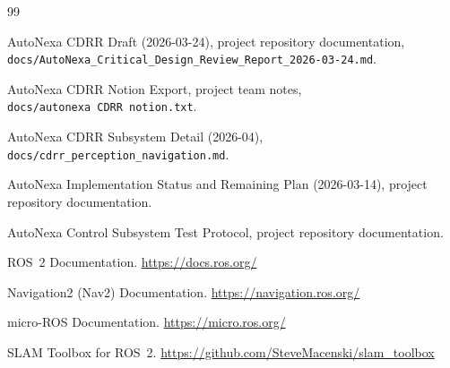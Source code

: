 \documentclass[12pt,a4paper]{report}
\begin{document}
\begin{thebibliography}{99}

AutoNexa CDRR Draft (2026-03-24), project repository documentation, \texttt{docs/AutoNexa\_Critical\_Design\_Review\_Report\_2026-03-24.md}.

AutoNexa CDRR Notion Export, project team notes, \texttt{docs/autonexa~CDRR~notion.txt}.

AutoNexa CDRR Subsystem Detail (2026-04), \texttt{docs/cdrr\_perception\_navigation.md}.

AutoNexa Implementation Status and Remaining Plan (2026-03-14), project repository documentation.

AutoNexa Control Subsystem Test Protocol, project repository documentation.

ROS~2 Documentation. \url{https://docs.ros.org/}

Navigation2 (Nav2) Documentation. \url{https://navigation.ros.org/}

micro-ROS Documentation. \url{https://micro.ros.org/}

SLAM Toolbox for ROS~2. \url{https://github.com/SteveMacenski/slam_toolbox}

\end{thebibliography}
\end{document}
